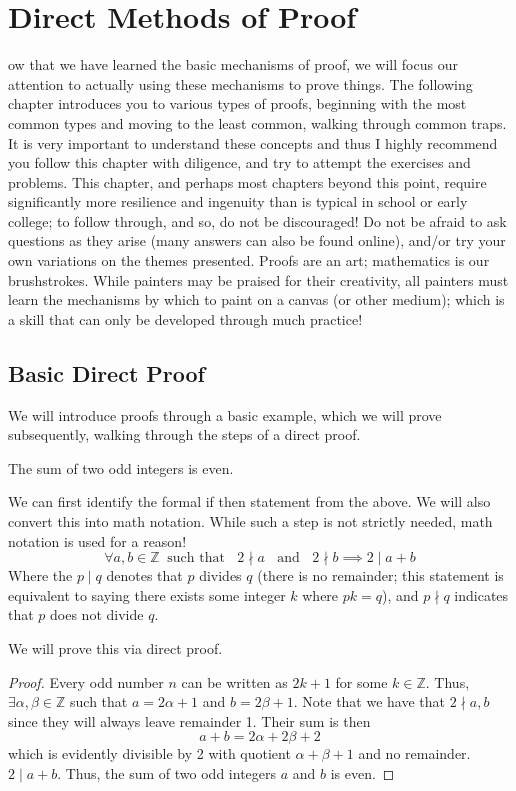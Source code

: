 \chapter{Direct Methods of Proof}
ow that we have learned the basic mechanisms of proof, we will focus our attention to actually using these mechanisms to prove things. The following chapter introduces you to various types of proofs, beginning with the most common types and moving to the least common, walking through common traps. It is very important to understand these concepts and thus I highly recommend you follow this chapter with diligence, and try to attempt the exercises and problems. This chapter, and perhaps most chapters beyond this point, require significantly more resilience and ingenuity than is typical in school or early college; to follow through, and so, do not be discouraged! Do not be afraid to ask questions as they arise (many answers can also be found online), and/or try your own variations on the themes presented. Proofs are an art; mathematics is our brushstrokes. While painters may be praised for their creativity, all painters must learn the mechanisms by which to paint on a canvas (or other medium); which is a skill that can only be developed through much practice!





\section{Basic Direct Proof}
We will introduce proofs through a basic example, which we will prove subsequently, walking through the steps of a direct proof.
\begin{example}
The sum of two odd integers is even.
\end{example}
We can first identify the formal if then statement from the above. We will also convert this into math notation. While such a step is not strictly needed, math notation is used for a reason!
\[
\forall a,b\in \mathbb{Z} ~\text{~such that ~}~ 2 \nmid a ~\text{~ and ~}~ 2 \nmid b \implies 2\mid a+b
\]
Where the $p\mid q$ denotes that $p$ divides $q$ (there is no remainder; this statement is equivalent to saying there exists some integer $k$ where $pk = q$), and $p \nmid q$ indicates that $p$ does not divide $q$. 

We will prove this via direct proof.

\begin{proof}
Every odd number $n$ can be written as $2k+1$ for some $k \in \mathbb{Z}$. Thus, $\exists \alpha, \beta \in \mathbb{Z}$ such that $a = 2\alpha + 1$ and $b = 2\beta + 1$. Note that we have that $2 \nmid a,b$ since they will always leave remainder 1. Their sum is then 
\[
a + b = 2\alpha + 2\beta + 2
\]
which is evidently divisible by 2 with quotient $\alpha + \beta + 1$ and no remainder. $ 2 \mid a + b$. Thus, the sum of two odd integers $a$ and $b$ is even.
\end{proof}

